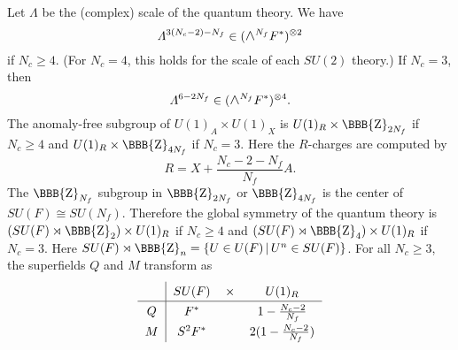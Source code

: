 \documentclass[lecture]{qft-l}
\newcommand{\Lam}{\varLambda}
\newcommand{\ZZ}{{\mbox{\BBB{Z}}}}
\newcommand{\medwedge}{\mbox{\fontsize{12pt}{0pt}\selectfont $\wedge$}}
\newcommand{\set}[2]{\{{#1}\,|\,{#2}\}}
\begin{document}
Let $\Lam$ be the (complex) scale of the quantum theory.
We have 
	\begin{equation}\label{so-scale}
\Lam^{3(N_c-2)-N_f}\in(\medwedge^{N_f}F^*)^{\otimes2}
	\end{equation}
if $N_c\ge4$.
(For $N_c=4$, this holds for the scale of each $SU(2)$ theory.) 
If $N_c=3$, then
	\begin{equation}\label{so3-scale}
\Lam^{6-2N_f}\in(\medwedge^{N_f}F^*)^{\otimes4}.
	\end{equation}
The anomaly-free subgroup of $U(1)_A\times U(1)_X$ is
$U(1)_R\times\ZZ_{2N_f}$ if $N_c\ge4$ and
$U(1)_R\times\ZZ_{4N_f}$ if $N_c=3$.
Here the $R$-charges are computed by
	\begin{equation}
R=X+\frac{N_c-2-N_f}{N_f}A.
	\end{equation}
The $\ZZ_{N_f}$ subgroup in $\ZZ_{2N_f}$ or $\ZZ_{4N_f}$ 
is the center of $SU(F)\cong SU(N_f)$.
Therefore the global symmetry of the quantum theory is
$(SU(F)\rtimes\ZZ_2)\times U(1)_R$ if $N_c\ge4$ 
and $(SU(F)\rtimes\ZZ_4)\times U(1)_R$ if $N_c=3$.
Here $SU(F)\rtimes\ZZ_n=\set{U\in U(F)}{U^n\in SU(F)}$.
For all $N_c\ge3$, the superfields $Q$ and $M$ transform as
\begin{equation}
\renewcommand{\arraystretch}{1.3}
\begin{tabular}{c|ccc}
&   $SU(F)$	&$\times$&	$U(1)_R$		\\
\hline
$Q$	&   $F^*$	&	&  $1-\frac{N_c-2}{N_f}$	\\
$M$	& $S^2F^*$ &	&  $2(1-\frac{N_c-2}{N_f})$
\end{tabular}
\end{equation}
\end{document}
